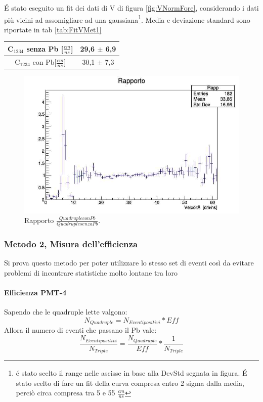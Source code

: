 \documentclass[a4paper]{article}
\begin{document}
\'E stato eseguito un fit dei dati di V di figura \ref{fig:VNormFore}, considerando i dati più vicini ad assomigliare ad una gaussiana\footnote{é stato scelto il range nelle ascisse in base alla DevStd segnata in figura. \'E stato scelto di fare un fit della curva compresa entro 2 sigma dalla media, perciò circa compresa tra 5 e 55 $\frac{cm}{ns}$}. Media e deviazione standard sono riportate in tab \ref{tab:FitVMet1}

\begin{tabular}{c|c}
C$_{1234}$ senza Pb [$\frac{cm}{ns}$] & 29,6 $\pm$ 6,9 \\
\hline
C$_{1234}$ con Pb[$\frac{cm}{ns}$] & 30,1 $\pm$ 7,3
\label{tab:FitVMet1}
\end{tabular}

\begin{figure}[H]
\centering
\includegraphics[scale=0.3]{./immagini/TimeOfFlight/VRappFore.jpg}
\caption{Rapporto $\frac{Quadruple con Pb}{Quadruple senza Pb}$.}
\label{fig:VRappFore}
\end{figure}

\subsubsection*{Metodo 2, Misura dell'efficienza}
\label{sec:Met2}
Si prova questo metodo per poter utilizzare lo stesso set di eventi così da evitare problemi di incontrare statistiche molto lontane tra loro

\paragraph{Efficienza PMT-4}
Sapendo che le quadruple lette valgono:
\begin{equation}
N_{Quadruple} = N_{Eventi positivi} * Eff
\end{equation}
Allora il numero di eventi che passano il Pb vale:
\begin{equation}
\frac{N_{Eventi positivi}}{N_{Triple}} = \frac{N_{Quadruple}}{Eff}*\frac{1}{N_{Triple}}
\label{eq:VRappMet2}
\end{equation}
\end{document}
